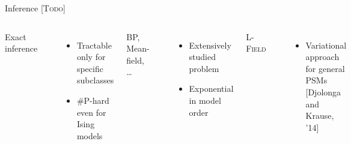 \documentclass[mathserif]{beamer}
\newcommand{\todo}[1]{{\scriptsize\color{yellow}\textsc{[Todo]}}}
\newcommand{\qcite}[1]{{\scriptsize\color{col2}[#1]}}
\begin{document}
\begin{frame}{Inference \todo{}}
\vspace{0.5em}
\begin{columns}[c]
\begin{minipage}[t][1.7em]{\textwidth}
\centering
Exact inference
\end{minipage}

\centering
\includegraphics[width=1.4in]{figures/inf01_exact.pdf}

\vspace{1em}
\begin{itemize}
\item \small{Tractable only for specific subclasses}
\vspace{1em}
\item \#P-hard even for Ising models
\end{itemize}

\begin{minipage}[t][1.7em]{\textwidth}
\centering
BP, Mean-field, \ldots
\end{minipage}

\centering
\includegraphics[width=1.4in]{figures/inf02_loworder.pdf}

\vspace{1em}
\begin{itemize}
\item \small{Extensively studied problem}
\vspace{1em}
\item \small{Exponential in model order}
\end{itemize}

\begin{minipage}[t][1.7em]{\textwidth}
\centering
L-\textsc{Field}
\end{minipage}

\centering
\includegraphics[width=1.4in]{figures/inf03_psm.pdf}

\vspace{1em}
\begin{itemize}
\item \small{Variational approach for general PSMs} \qcite{Djolonga and Krause, '14}
\vspace{1.2em}
\end{itemize}
\end{columns}
\end{frame}
\end{document}
